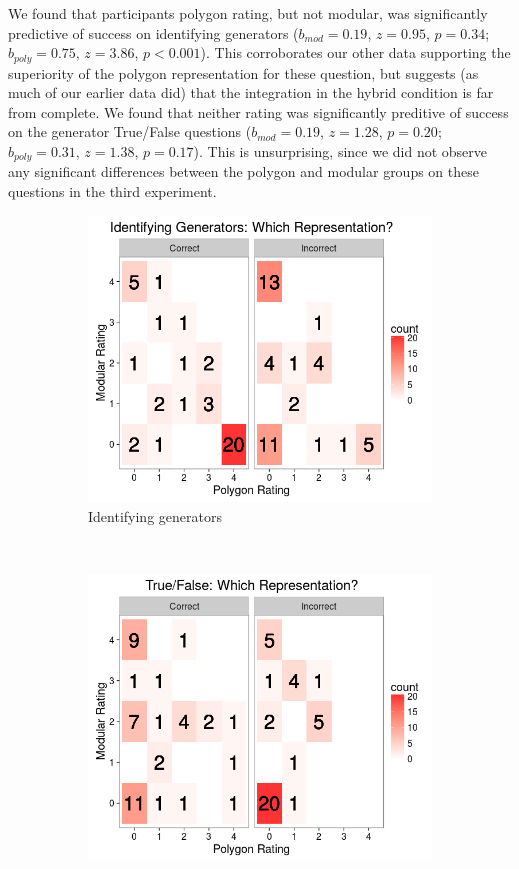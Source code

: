 \documentclass[man,mask,10pt]{apa6}
\begin{document}
We found that participants polygon rating, but not modular, was significantly predictive of success on identifying generators ($b_{mod} = 0.19$, $z = 0.95$, $p = 0.34$; $b_{poly} = 0.75$, $z = 3.86$, $p < 0.001$). This corroborates our other data supporting the superiority of the polygon representation for these question, but suggests (as much of our earlier data did) that the integration in the hybrid condition is far from complete. We found that neither rating was significantly preditive of success on the generator True/False questions ($b_{mod} = 0.19$, $z = 1.28$, $p = 0.20$; $b_{poly} = 0.31$, $z = 1.38$, $p = 0.17$). This is unsurprising, since we did not observe any significant differences between the polygon and modular groups on these questions in the third experiment. 
\begin{figure}
\centering
\begin{subfigure}[c]{0.45\textwidth}
\centering 
\includegraphics[width=\textwidth]{figures/3/wr_genT.png}
\caption{Identifying generators}
\end{subfigure}
~
\begin{subfigure}[c]{0.45\textwidth}
\centering 
\includegraphics[width=\textwidth]{figures/3/wr_genTF.png}

\end{subfigure}
\end{figure}
\end{document}
